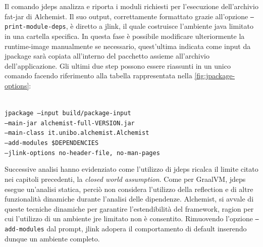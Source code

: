 Il comando jdeps analizza e riporta i moduli richiesti per l'esecuzione dell'archivio fat-jar di Alchemist. Il suo output, correttamente formattato grazie all'opzione \texttt{--print-module-deps}, è diretto a jlink, il quale costruisce l'ambiente java limitato in una cartella specifica. In questa fase è possibile modificare ulteriormente la runtime-image manualmente se necessario, quest'ultima indicata come input da jpackage sarà copiata all'interno del pacchetto assieme all'archivio dell'applicazione. Gli ultimi due step possono essere riassunti in un unico comando facendo riferimento alla tabella rappresentata nella \cref{fig:jpackage-options}:

\texttt{\\ jpackage --input build/package-input \\ \tab\tab --main-jar alchemist-full-VERSION.jar \\ \tab\tab --main-class it.unibo.alchemist.Alchemist \\ \tab\tab --add-modules \$DEPENDENCIES \\ \tab\tab --jlink-options no-header-file, no-man-pages \\}

Successive analisi hanno evidenziato come l'utilizzo di jdeps ricalca il limite citato nei capitoli precedenti, la \textit{closed world assumption}. Come per GraalVM, jdeps esegue un'analisi statica, perciò non considera l'utilizzo della reflection e di altre funzionalità dinamiche durante l'analisi delle dipendenze. Alchemist, si avvale di queste tecniche dinamiche per garantire l'estendibilità del framework, ragion per cui l'utilizzo di un ambiente \ac{jre} limitato non è consentito. Rimuovendo l'opzione \texttt{--add-modules} dal prompt, jlink adopera il comportamento di default inserendo dunque un ambiente completo.

